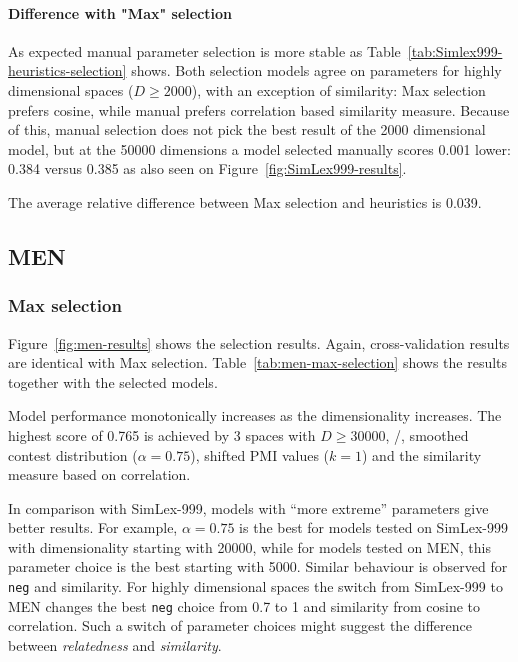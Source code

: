 \paragraph{Difference with "Max" selection}



As expected manual parameter selection is more stable as Table~\ref{tab:Simlex999-heuristics-selection} shows. Both selection models agree on parameters for highly dimensional spaces ($D \geq 2000$), with an exception of similarity: Max selection prefers cosine, while manual prefers correlation based similarity measure. Because of this, manual selection does not pick the best result of the 2000 dimensional model, but at the 50000 dimensions  a model selected manually scores 0.001 lower: 0.384 versus 0.385 as also seen on Figure~\ref{fig:SimLex999-results}.

The average relative difference between Max selection and heuristics is 0.039.

\subsection{MEN}
\label{sec:men}

\subsubsection{Max selection}
\label{sec:max-selection-men}



Figure~\ref{fig:men-results} shows the selection results. Again, cross-validation results are identical with Max selection. Table~\ref{tab:men-max-selection} shows the results together with the selected models.



Model performance monotonically increases as the dimensionality increases. The highest score of 0.765 is achieved by 3 spaces with $D \geq 30000$, \logNSCPMI/, smoothed contest distribution ($\alpha = 0.75$), shifted PMI values ($k = 1$) and the similarity measure based on correlation.

In comparison with SimLex-999, models with ``more extreme'' parameters give better results. For example, $\alpha = 0.75$ is the best for models tested on SimLex-999 with dimensionality starting with 20000, while for models tested on MEN, this parameter choice is the best starting with 5000. Similar behaviour is observed for \texttt{neg} and similarity. For highly dimensional spaces the switch from SimLex-999 to MEN changes the best \texttt{neg} choice from 0.7 to 1 and similarity from cosine to correlation. Such a switch of parameter choices might suggest the difference between \textit{relatedness} and \textit{similarity}.

